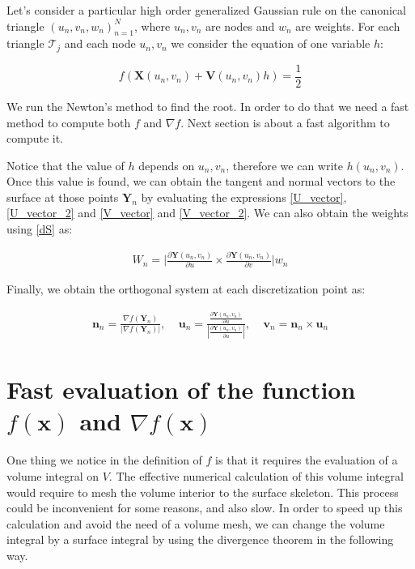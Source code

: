 \documentclass[11pt, oneside]{article}
\newcommand\bx{\boldsymbol x}
\newcommand\bn{\boldsymbol n}
\newcommand\bX{\boldsymbol X}
\newcommand\bY{\boldsymbol Y}
\newcommand\bV{\boldsymbol V}
\newcommand\bu{\boldsymbol u}
\newcommand\bv{\boldsymbol v}
\begin{document}
Let's consider a particular high order generalized Gaussian rule on the canonical triangle $(u_n,v_n,w_n)_{n=1}^N$, where $u_n,v_n$ are nodes and $w_n$ are weights. For each triangle $\mathcal{T}_j$ and each node $u_n,v_n$ we consider the equation of one variable $h$:

\begin{equation}\label{newtoneq}
f(\bX(u_n,v_n)+\bV(u_n,v_n)h)=\frac{1}{2}
\end{equation}

We run the Newton's method to find the root. In order to do that we need a fast method to compute both $f$ and $\nabla f$. Next section is about a fast algorithm to compute it.

Notice that the value of $h$ depends on $u_n,v_n$, therefore we can write $h(u_n,v_n)$. Once this value is found, we can obtain the tangent and normal vectors to the surface at those points $\bY_n$ by evaluating the expressions \ref{U_vector}, \ref{U_vector_2} and \ref{V_vector} and \ref{V_vector_2}. We can also obtain the weights using \ref{dS} as:

\begin{equation}\label{dS_n}
\begin{aligned}
 W_n=\Bigg|\frac{\partial\bY(u_n,v_n)}{\partial u}\times\frac{\partial\bY(u_n,v_n)}{\partial v}\Bigg|w_n
\end{aligned}
\end{equation}

Finally, we obtain the orthogonal system at each discretization point as:

\begin{equation}
\begin{aligned}
\bn_n=\frac{\nabla f(\bY_n)}{|\nabla f(\bY_n)|},\  \  \  \   \ 
\bu_n=\frac{\frac{\partial\bY(u_n,v_n)}{\partial u}}{|\frac{\partial\bY(u_n,v_n)}{\partial u}|},\  \  \  \   \
\bv_n=\bn_n\times\bu_n
\end{aligned}
\end{equation}

\section{Fast evaluation of the function $f(\bx)$ and $\nabla f(\bx)$}

One thing we notice in the definition of $f$ is that it requires the evaluation of a volume integral on $\mathit{V}$. The effective numerical calculation of this volume integral would require to mesh the volume interior to the surface skeleton. This process could be inconvenient for some reasons, and also slow.  In order to speed up this calculation and avoid the need of a volume mesh, we can change the volume integral by a surface integral by using the divergence theorem in the following way.
\end{document}

